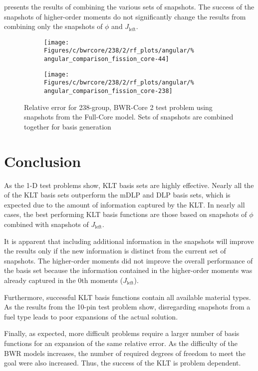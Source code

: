  presents the results of combining the 
various sets of snapshots.  The success of the snapshots of higher-order 
moments do not significantly change the results from combining only the 
snapshots of $\phi$ and $J_{\text{left}}$.

\begin{figure*}[tb]
    \centering
    \begin{subfigure}{0.5\textwidth}
        \centering
        \texttt{[image: Figures/c/bwrcore/238/2/rf\_plots/angular/\%
            angular\_comparison\_fission\_core-44]}
    \end{subfigure}%
    \begin{subfigure}{0.5\textwidth}
        \centering
        \texttt{[image: Figures/c/bwrcore/238/2/rf\_plots/angular/\%
            angular\_comparison\_fission\_core-238]}
    \end{subfigure}
    \caption{Relative error for 238-group, BWR-Core 2 test problem using 
        snapshots from the Full-Core model.  Sets of snapshots are combined 
        together for basis generation}
    \label{fig:BWR2-core-combined-238}
\end{figure*}

\section{Conclusion}

As the 1-D test problems show, KLT basis sets are highly effective.  Nearly all the of the KLT 
basis sets outperform the mDLP and DLP basis sets, which is expected due to the amount of 
information captured by the KLT.  In nearly all cases, the best performing KLT basis functions are 
those based on snapshots of $\phi$ combined with snapshots of $J_{\text{left}}$.  

It is apparent that including additional information in the snapshots will improve the results only 
if the new information is distinct from the current set of snapshots.  The higher-order moments did 
not improve the overall performance of the basis set because the information contained in the 
higher-order moments was already captured in the 0th moments ($J_{\text{left}}$).

Furthermore, successful KLT basis functions contain all available material types.  As the results 
from the 10-pin test problem show, disregarding snapshots from a fuel type leads to poor expansions 
of the actual solution.  

Finally, as expected, more difficult problems require a larger number of basis functions for an 
expansion of the same relative error.  As the difficulty of the BWR models increases, the number of 
required degrees of freedom to meet the goal were also increased.  Thus, the success of the KLT is 
problem dependent.